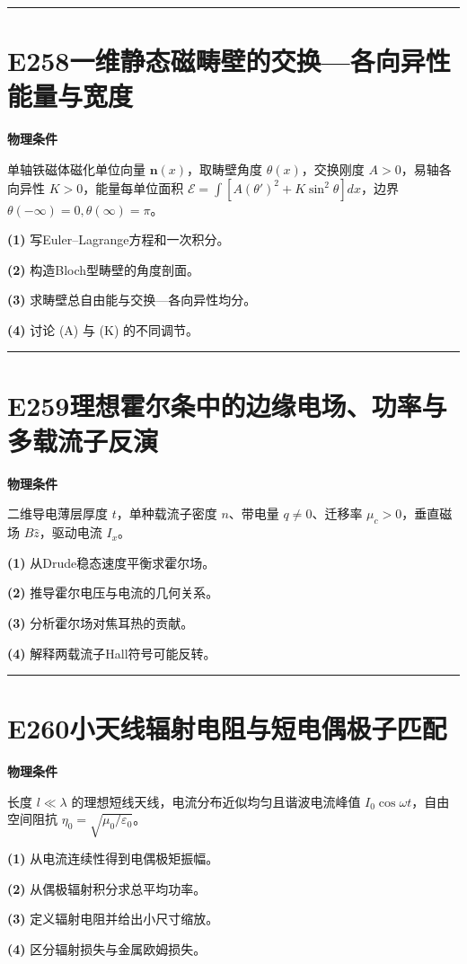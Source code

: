 \documentclass[UTF8,a4paper,11pt,oneside,openany]{ctexbook}
\begin{document}
\par\bigskip\hrule\bigskip
\section*{E258\quad 一维静态磁畴壁的交换—各向异性能量与宽度}
\textbf{物理条件}\par 单轴铁磁体磁化单位向量 \(\boldsymbol n(x)\)，取畴壁角度 \(\theta(x)\)，交换刚度 \(A>0\)，易轴各向异性 \(K>0\)，能量每单位面积 \(\mathcal E=\int[A(\theta')^2+K\sin^2\theta]dx\)，边界 \(\theta(-\infty)=0,\theta(\infty)=\pi\)。
\par\noindent\textbf{(1)} 写Euler–Lagrange方程和一次积分。
\par\noindent\textbf{(2)} 构造Bloch型畴壁的角度剖面。
\par\noindent\textbf{(3)} 求畴壁总自由能与交换—各向异性均分。
\par\noindent\textbf{(4)} 讨论 (A) 与 (K) 的不同调节。

\par\bigskip\hrule\bigskip
\section*{E259\quad 理想霍尔条中的边缘电场、功率与多载流子反演}
\textbf{物理条件}\par 二维导电薄层厚度 \(t\)，单种载流子密度 \(n\)、带电量 \(q\ne0\)、迁移率 \(\mu_c>0\)，垂直磁场 \(B\hat z\)，驱动电流 \(I_x\)。
\par\noindent\textbf{(1)} 从Drude稳态速度平衡求霍尔场。
\par\noindent\textbf{(2)} 推导霍尔电压与电流的几何关系。
\par\noindent\textbf{(3)} 分析霍尔场对焦耳热的贡献。
\par\noindent\textbf{(4)} 解释两载流子Hall符号可能反转。

\par\bigskip\hrule\bigskip
\section*{E260\quad 小天线辐射电阻与短电偶极子匹配}
\textbf{物理条件}\par 长度 \(l\ll\lambda\) 的理想短线天线，电流分布近似均匀且谐波电流峰值 \(I_0\cos\omega t\)，自由空间阻抗 \(\eta_0=\sqrt{\mu_0/\varepsilon_0}\)。
\par\noindent\textbf{(1)} 从电流连续性得到电偶极矩振幅。
\par\noindent\textbf{(2)} 从偶极辐射积分求总平均功率。
\par\noindent\textbf{(3)} 定义辐射电阻并给出小尺寸缩放。
\par\noindent\textbf{(4)} 区分辐射损失与金属欧姆损失。
\end{document}
